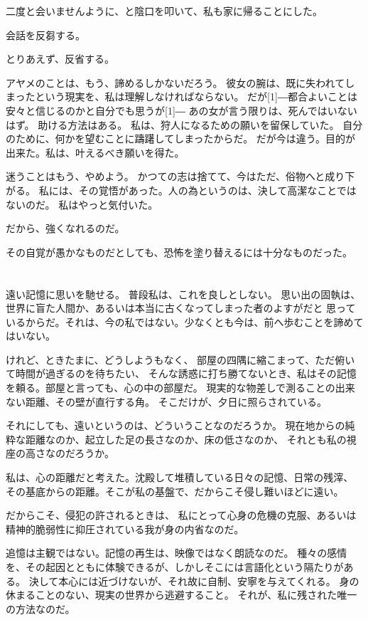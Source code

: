 \documentclass[../IHMain]{subfiles}
\begin{document}
二度と会いませんように、と陰口を叩いて、私も家に帰ることにした。

会話を反芻する。

とりあえず、反省する。

アヤメのことは、もう、諦めるしかないだろう。
彼女の腕は、既に失われてしまったという現実を、私は理解しなければならない。
だが\scalebox{3}[1]{―}都合よいことは安々と信じるのかと自分でも思うが\scalebox{3}[1]{―}
あの女が言う限りは、死んではいないはず。
助ける方法はある。
私は、狩人になるための願いを留保していた。
自分のために、何かを望むことに躊躇してしまったからだ。
だが今は違う。目的が出来た。私は、叶えるべき願いを得た。

迷うことはもう、やめよう。
かつての志は捨てて、今はただ、俗物へと成り下がる。
私には、その覚悟があった。人の為というのは、決して高潔なことではないのだ。
私はやっと気付いた。

だから、強くなれるのだ。

その自覚が愚かなものだとしても、恐怖を塗り替えるには十分なものだった。

\section{}
遠い記憶に思いを馳せる。
普段私は、これを良しとしない。
思い出の固執は、世界に盲た人間か、あるいは本当に古くなってしまった者のよすがだと
思っているからだ。それは、今の私ではない。少なくとも今は、前へ歩むことを諦めてはいない。

けれど、ときたまに、どうしようもなく、
部屋の四隅に縮こまって、ただ俯いて時間が過ぎるのを待ちたい、
そんな誘惑に打ち勝てないとき、私はその記憶を頼る。部屋と言っても、心の中の部屋だ。
現実的な物差しで測ることの出来ない距離、その壁が直行する角。
そこだけが、夕日に照らされている。

それにしても、遠いというのは、どういうことなのだろうか。
現在地からの純粋な距離なのか、起立した足の長さなのか、床の低さなのか、
それとも私の視座の高さなのだろうか。

私は、心の距離だと考えた。沈殿して堆積している日々の記憶、日常の残滓、
その基底からの距離。そこが私の基盤で、だからこそ侵し難いほどに遠い。

だからこそ、侵犯の許されるときは、
私にとって心身の危機の克服、あるいは精神的脆弱性に抑圧されている我が身の内省なのだ。

追憶は主観ではない。記憶の再生は、映像ではなく朗読なのだ。
種々の感情を、その起因とともに体験できるが、しかしそこには言語化という隔たりがある。
決して本心には近づけないが、それ故に自制、安寧を与えてくれる。
身の休まることのない、現実の世界から逃避すること。
それが、私に残された唯一の方法なのだ。\\
\end{document}

